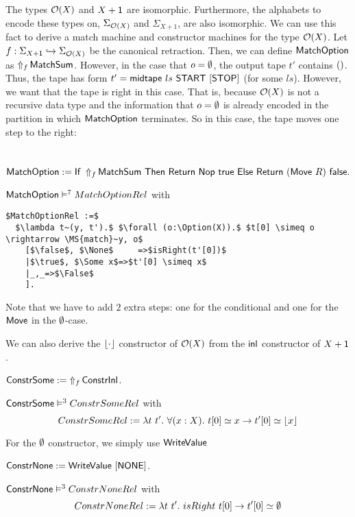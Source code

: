 The types $\Option(X)$ and $X+\Unit$ are isomorphic.  Furthermore, the alphabets to encode these types on, $\Sigma_{\Option(X)}$ and $\Sigma_{X+1}$,
are also isomorphic.  We can use this fact to derive a match machine and constructor machines for the type $\Option(X)$.  Let
$f : \Sigma_{X+\Unit} \hookrightarrow \Sigma_{\Option(X)}$ be the canonical retraction.  Then, we can define $\MS{MatchOption}$ as
$\LiftAlphabet{\MS{MatchSum}}{f}$.  However, in the case that $o=\None$, the output tape $t'$ contains $\unit$.  Thus, the tape has form
$t' = \MS{midtape}~ls~\MS{START}~[\MS{STOP}]$ (for some $ls$).  However, we want that the tape is right in this case.  That is, because $\Option(X)$
is not a recursive data type and the information that $o=\None$ is already encoded in the partition in which $\MS{MatchOption}$ terminates.  So in
this case, the tape moves one step to the right:
\begin{definition}[$\MS{MatchOption}$][MatchOption]
  \label{def:MatchOption}
  ~
  \[
    \MS{MatchOption} := \If{\LiftAlphabet{\MS{MatchSum}}{f}}{\Return{\Nop}{\true}}{\Return{(\MS{Move}~R)}{\false}}.
  \]
\end{definition}

\begin{lemma}
  \label{lem:MatchSum_Realise}
  $\MS{MatchOption} \RealiseIn{7} MatchOptionRel$ with
\begin{lstlisting}[style=semicoqstyle]
$MatchOptionRel :=$
  $\lambda t~(y, t').$ $\forall (o:\Option(X)).$ $t[0] \simeq o \rightarrow \MS{match}~y, o$
    [$\false$, $\None$     =>$isRight(t'[0])$
    |$\true$, $\Some x$=>$t'[0] \simeq x$
    |_,_=>$\False$
    ].
\end{lstlisting}
\end{lemma}
Note that we have to add $2$ extra steps: one for the conditional and one for the $\MS{Move}$ in the $\None$-case.

We can also derive the $\Some{\cdot}$ constructor of $\Option(X)$ from the $\inl$ constructor of $X+\Unit$.
\begin{definition}
  \label{def:Constr_Some}
  $\MS{ConstrSome} := \LiftAlphabet{\MS{ConstrInl}}{f}$.
\end{definition}
\begin{lemma}
  \label{lem:Constr_Some_Sem}
  $\MS{ConstrSome} \RealiseIn{3} ConstrSomeRel$ with
  \[
    ConstrSomeRel := \lambda t~t'.~\forall(x:X).~t[0] \simeq x \rightarrow t'[0] \simeq \Some{x}
  \]
\end{lemma}
For the $\None$ constructor, we simply use $\MS{WriteValue}$
\begin{definition}
  \label{def:Constr_None}
  $\MS{ConstrNone} := \MS{WriteValue}~[\MS{NONE}]$.
\end{definition}
\begin{lemma}
  \label{lem:Constr_None_Sem}
  $\MS{ConstrNone} \RealiseIn{3} ConstrNoneRel$ with
  \[
    ConstrNoneRel := \lambda t~t'.~isRight~t[0] \rightarrow t'[0] \simeq \None
  \]
\end{lemma}


